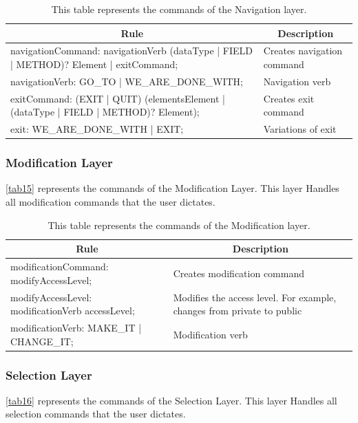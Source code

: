 \begin{table}[H]
	\centering
	\begin{tabular}{|p{8cm}|p{7cm}|}
		\hline
		\multicolumn{1}{|c|}{{\bf Rule}} & \multicolumn{1}{c|}{{\bf Description}} \\ \hline
		navigationCommand: navigationVerb (dataType | FIELD | METHOD)? Element | exitCommand; & Creates navigation command             \\ \hline
		navigationVerb: GO\_TO | WE\_ARE\_DONE\_WITH; & Navigation verb                        \\ \hline
		exitCommand: (EXIT | QUIT) (elementsElement | (dataType | FIELD | METHOD)? Element);  & Creates exit command                   \\ \hline
		exit: WE\_ARE\_DONE\_WITH | EXIT; & Variations of exit                     \\ \hline
	\end{tabular}
		\caption{This table represents the commands of the Navigation layer.}
		\label{tab14}
\end{table}

\subsubsection{Modification Layer}
\autoref{tab15} represents the commands of the Modification Layer.  This layer Handles all modification commands that the user dictates.

\begin{table}[H]
	\centering
	\begin{tabular}{|p{8cm}|p{7cm}|}
		\hline
		\multicolumn{1}{|c|}{{\bf Rule}}                 & \multicolumn{1}{c|}{{\bf Description}}                                 \\ \hline
		modificationCommand: modifyAccessLevel;          & Creates modification command                                           \\ \hline
		modifyAccessLevel: modificationVerb accessLevel; & Modifies the access level. For example, changes from private to public \\ \hline
		modificationVerb: MAKE\_IT | CHANGE\_IT;         & Modification verb                                                      \\ \hline
	\end{tabular}
		\caption{This table represents the commands of the Modification layer.}
		\label{tab15}
\end{table}

\subsubsection{Selection Layer}
\autoref{tab16} represents the commands of the Selection Layer.  This layer Handles all selection commands that the user dictates.

